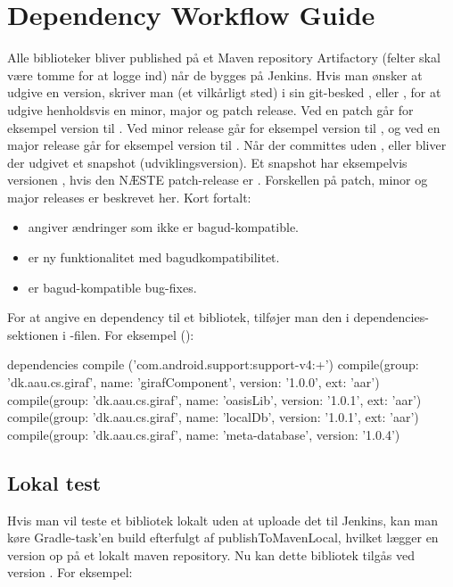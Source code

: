 \chapter{Dependency Workflow Guide}\label{app:dependency_workflow_guide}
Alle biblioteker bliver published på et Maven repository Artifactory (felter skal være tomme for at logge ind) når de bygges på Jenkins. Hvis man ønsker at udgive en version, skriver man (et vilkårligt sted) i sin git-besked ,  eller , for at udgive henholdsvis en minor, major og patch release. Ved en patch går for eksempel version  til . Ved minor release går for eksempel version  til , og ved en major release går for eksempel version  til . Når der committes uden ,  eller  bliver der udgivet et snapshot (udviklingsversion). Et snapshot har eksempelvis versionen , hvis den NÆSTE patch-release er . Forskellen på patch, minor og major releases er beskrevet her. Kort fortalt:
\begin{itemize}
  \item {} angiver ændringer som ikke er bagud-kompatible.
  \item {} er ny funktionalitet med bagudkompatibilitet.
  \item {} er bagud-kompatible bug-fixes.
\end{itemize}

For at angive en dependency til et bibliotek, tilføjer man den i dependencies-sektionen i -filen. For eksempel ():

\begin{gradlecode}[caption=Dekleration af dependencies,label=lst:decl_depe]
dependencies {
  compile ('com.android.support:support-v4:+')
  compile(group: 'dk.aau.cs.giraf', name: 'girafComponent', version: '1.0.0', ext: 'aar')
  compile(group: 'dk.aau.cs.giraf', name: 'oasisLib', version: '1.0.1', ext: 'aar')
  compile(group: 'dk.aau.cs.giraf', name: 'localDb', version: '1.0.1', ext: 'aar')
  compile(group: 'dk.aau.cs.giraf', name: 'meta-database', version: '1.0.4')
}
\end{gradlecode}

\section{Lokal test}
Hvis man vil teste et bibliotek lokalt uden at uploade det til Jenkins, kan man køre Gradle-task'en build efterfulgt af publishToMavenLocal, hvilket lægger en version  op på et lokalt maven repository. Nu kan dette bibliotek tilgås ved version . For eksempel: 

